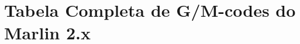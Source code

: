 		\section[Tabela Completa de G/M-codes do Marlin 2.x]{Tabela Completa de G/M-codes do Marlin 2.x}

	



